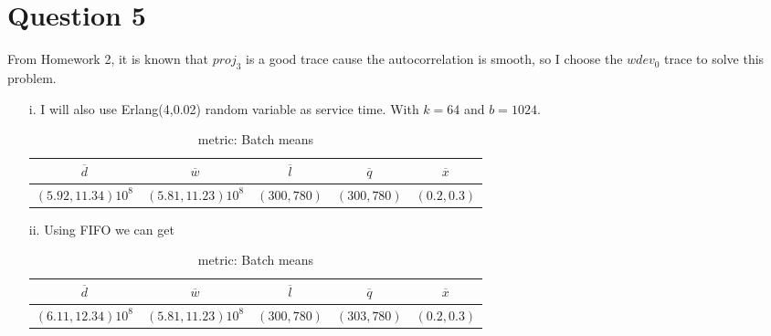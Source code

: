 \documentclass[11pt]{article}
\begin{document}
\section{Question 5}
From Homework 2, it is known that $proj_3$ is a good trace cause the autocorrelation is smooth, so I choose the $wdev_0$ trace to solve this problem.
\begin{enumerate}
\item[i.]
I will also use Erlang(4,0.02) random variable as service time. With $k=64$ and $b=1024$.
\begin{table}[htdp]
\caption{metric: Batch means}
\begin{center}
\begin{tabular}{c|c|c|c|c}
 $\overline{d}$ & $\overline{w}$ & $\overline{l}$& $ \overline{q} $ & $ \overline{x} $\\
\hline
$(5.92,11.34)10^8$ & $(5.81,11.23)10^8$& $(300,780)$ & $(300, 780)$ & $(0.2,0.3) $\\

\end{tabular}
\end{center}
\label{default}
\end{table}%
\item[ii.]
Using FIFO we can get
\begin{table}[htdp]
\caption{metric: Batch means}
\begin{center}
\begin{tabular}{c|c|c|c|c}
 $\overline{d}$ & $\overline{w}$ & $\overline{l}$& $ \overline{q} $ & $ \overline{x} $\\
\hline
$(6.11,12.34)10^8$ & $(5.81,11.23)10^8$& $(300,780)$ & $(303, 780)$ & $(0.2,0.3) $\\


\end{tabular}
\end{center}
\end{table}
\end{enumerate}
\end{document}
